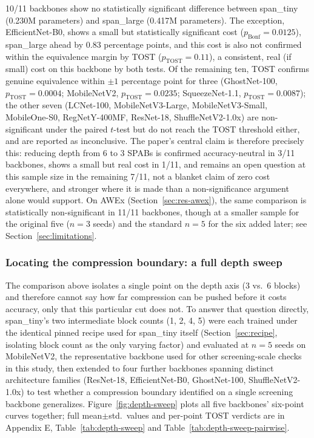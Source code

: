 \documentclass[pdflatex,sn-vancouver-num]{sn-jnl}
\begin{document}
10/11 backbones show no statistically significant difference between span\_tiny (0.230M parameters) and span\_large (0.417M parameters). The exception, EfficientNet-B0, shows a small but statistically significant cost ($p_{\text{Bonf}}{=}0.0125$), span\_large ahead by 0.83 percentage points, and this cost is also not confirmed within the equivalence margin by TOST ($p_{\text{TOST}}{=}0.11$), a consistent, real (if small) cost on this backbone by both tests. Of the remaining ten, TOST confirms genuine equivalence within $\pm 1$ percentage point for three (GhostNet-100, $p_{\text{TOST}}{=}0.0004$; MobileNetV2, $p_{\text{TOST}}{=}0.0235$; SqueezeNet-1.1, $p_{\text{TOST}}{=}0.0087$); the other seven (LCNet-100, MobileNetV3-Large, MobileNetV3-Small, MobileOne-S0, RegNetY-400MF, ResNet-18, ShuffleNetV2-1.0x) are non-significant under the paired $t$-test but do not reach the TOST threshold either, and are reported as inconclusive. The paper's central claim is therefore precisely this: reducing depth from 6 to 3 SPABs is confirmed accuracy-neutral in 3/11 backbones, shows a small but real cost in 1/11, and remains an open question at this sample size in the remaining 7/11, not a blanket claim of zero cost everywhere, and stronger where it is made than a non-significance argument alone would support. On AWEx (Section~\ref{sec:res-awex}), the same comparison is statistically non-significant in 11/11 backbones, though at a smaller sample for the original five ($n=3$ seeds) and the standard $n=5$ for the six added later; see Section~\ref{sec:limitations}.

\subsubsection{Locating the compression boundary: a full depth sweep}
\label{sec:depth-sweep}

The comparison above isolates a single point on the depth axis (3 vs.\ 6 blocks) and therefore cannot say how far compression can be pushed before it costs accuracy, only that this particular cut does not. To answer that question directly, span\_tiny's two intermediate block counts (1, 2, 4, 5) were each trained under the identical pinned recipe used for span\_tiny itself (Section~\ref{sec:recipe}, isolating block count as the only varying factor) and evaluated at $n=5$ seeds on MobileNetV2, the representative backbone used for other screening-scale checks in this study, then extended to four further backbones spanning distinct architecture families (ResNet-18, EfficientNet-B0, GhostNet-100, ShuffleNetV2-1.0x) to test whether a compression boundary identified on a single screening backbone generalizes. Figure~\ref{fig:depth-sweep} plots all five backbones' six-point curves together; full mean$\pm$std.\ values and per-point TOST verdicts are in Appendix E, Table~\ref{tab:depth-sweep} and Table~\ref{tab:depth-sweep-pairwise}.
\end{document}
